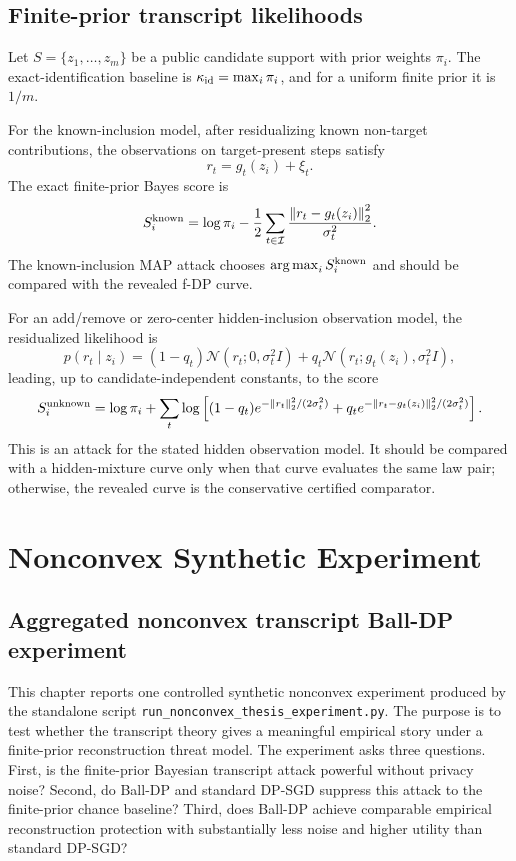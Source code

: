 \documentclass[11pt,a4paper]{report}
\theoremstyle{plain}
\theoremstyle{definition}
\theoremstyle{remark}
\DeclareMathOperator*{\argmax}{arg\,max}
\newcommand{\N}{\mathcal{N}}
\newcommand{\norm}[1]{\left\lVert #1\right\rVert}
\begin{document}
\section{Finite-prior transcript likelihoods}
\label{sec:transcript-map-attacks}

Let $S=\{z_1,\ldots,z_m\}$ be a public candidate support with prior weights $\pi_i$.  The exact-identification baseline is $\kappa_{\rm id}=\max_i\pi_i$, and for a uniform finite prior it is $1/m$.

For the known-inclusion model, after residualizing known non-target contributions, the observations on target-present steps satisfy
\[
r_t=g_t(z_i)+\xi_t.
\]
The exact finite-prior Bayes score is
\[
S_i^{\rm known}
=
\log\pi_i
-
\frac12\sum_{t\in\mathcal I}
\frac{\norm{r_t-g_t(z_i)}_2^2}{\sigma_t^2}.
\]
The known-inclusion MAP attack chooses $\argmax_i S_i^{\rm known}$ and should be compared with the revealed f-DP curve.

For an add/remove or zero-center hidden-inclusion observation model, the residualized likelihood is
\[
p(r_t\mid z_i)
=
(1-q_t)\N(r_t;0,\sigma_t^2I)
+q_t\N(r_t;g_t(z_i),\sigma_t^2I),
\]
leading, up to candidate-independent constants, to the score
\[
S_i^{\rm unknown}
=
\log\pi_i
+
\sum_t
\log\left[
(1-q_t)e^{-\norm{r_t}_2^2/(2\sigma_t^2)}
+q_t e^{-\norm{r_t-g_t(z_i)}_2^2/(2\sigma_t^2)}
\right].
\]
This is an attack for the stated hidden observation model.  It should be compared with a hidden-mixture curve only when that curve evaluates the same law pair; otherwise, the revealed curve is the conservative certified comparator.

\chapter{Nonconvex Synthetic Experiment}
\label{ch:nonconvex-experiment}

\section{Aggregated nonconvex transcript Ball-DP experiment}
\label{sec:aggregated-nonconvex-experiment}

This chapter reports one controlled synthetic nonconvex experiment produced by the standalone script \texttt{run\_nonconvex\_thesis\_experiment.py}.  The purpose is to test whether the transcript theory gives a meaningful empirical story under a finite-prior reconstruction threat model.  The experiment asks three questions.  First, is the finite-prior Bayesian transcript attack powerful without privacy noise?  Second, do Ball-DP and standard DP-SGD suppress this attack to the finite-prior chance baseline?  Third, does Ball-DP achieve comparable empirical reconstruction protection with substantially less noise and higher utility than standard DP-SGD?
\end{document}
